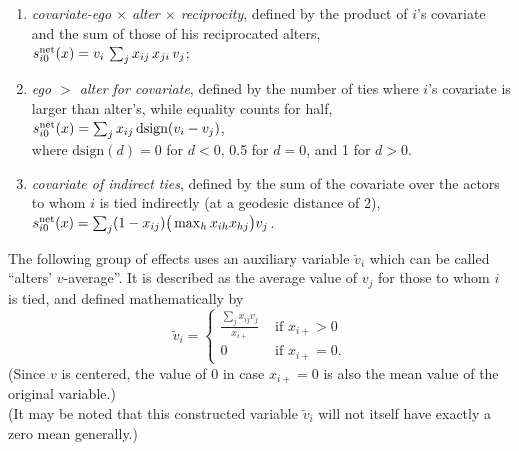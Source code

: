 \documentclass[a4paper,fleqn]{article}
\newcommand{\+}{\, + \,}
\newcommand{\vit}{\theenumi}
\newcounter{savenumi}
\begin{document}
{\begin{enumerate}
 \item {\em covariate-ego $\times$ alter $\times$ reciprocity},
 defined by the product of $i$'s covariate and the sum of those of his reciprocated alters,\\
 $s^{\rm net}_{i\vit}(x) = v_i \, \sum_j x_{ij}\,x_{ji}\, v_j $;

 \item {\em ego $>$ alter for covariate},
 defined by the number of ties where $i$'s covariate
 is larger than alter's, while equality counts for half,\\
 $s^{\rm net}_{i\vit}(x) =  \sum_j x_{ij}\, \text{dsign}(v_i - v_j) $,\\
 where $\text{dsign}(d) = 0$ for $d < 0$, 0.5 for $d = 0$,
 and 1 for $d > 0$.

 \item {\em covariate of indirect ties}, defined by
 the sum of the covariate over the actors
 to whom $i$ is tied indirectly (at a geodesic distance of 2),\\
 $s^{\rm net}_{i\vit}(x) = \sum_j (1 -x_{ij})
                      \big( \max_h x_{ih}x_{hj} \big) v_j $.
\setcounter{savenumi}{\value{enumi}}
\end{enumerate}

\noindent
The following group of effects uses an auxiliary variable $\breve v_i$ which
can be called ``alters' $v$-average''.
It is described as the average value of $v_j$ for those
to whom $i$ is tied, and defined mathematically by
\begin{equation}
  \breve v_i = \left\{\begin{array}{ll} \displaystyle
         \frac{\sum_j x_{ij}v_j}{x_{i+}}  &  \text{ if } x_{i+} > 0     \\
         0                                &  \text{ if } x_{i+} = 0  .
  \end{array}   \right.            \label{alt_av}
\end{equation}
(Since $v$ is centered, the value of 0 in case $x_{i+} = 0$ is also the mean value
of the original variable.)\\
(It may be noted that this constructed variable $\breve v_i$
will not itself have exactly a zero mean generally.)

}
\end{document}
